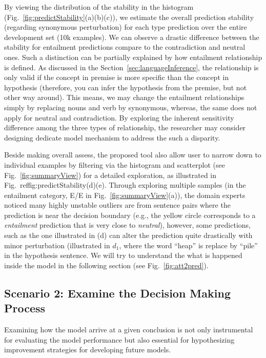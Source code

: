By viewing the distribution of the stability in the histogram (Fig.~\ref{fig:predictStability}(a)(b)(c)), we estimate the overall prediction stability (regarding synonymous perturbation) for each type prediction over the entire development set (10k examples).
%
We can observe a drastic difference between the stability for entailment predictions compare to the contradiction and neutral ones.
%
Such a distinction can be partially explained by how entailment relationship is defined. As discussed in the Section~\ref{sec:languageInference}, the relationship is only valid if the concept in premise is more specific than the concept in hypothesis (therefore, you can infer the hypothesis from the premise, but not other way around). This means, we may change the entailment relationships simply by replacing nouns and verb by synonymous, whereas, the same does not apply for neutral and contradiction.
%
By exploring the inherent sensitivity difference among the three types of relationship, the researcher may consider designing dedicate model mechanism to address the such a disparity.

Beside making overall assess, the proposed tool also allow user to narrow down to individual examples by filtering via the histogram and scatterplot (see Fig.~\ref{fig:summaryView}) for a detailed exploration, as illustrated in Fig.~ref{fig:predictStability}(d)(e). 
%
Through exploring multiple samples (in the entailment category, E/E in Fig.~\ref{fig:summaryView}(a)), the domain experts noticed many highly unstable outliers are from sentence pairs where the prediction is near the decision boundary (e.g., the yellow circle corresponds to a \emph{entailment} prediction that is very close to \emph{neutral}), however, some predictions, such as the one illustrated in (d) can alter the prediction quite drastically with minor perturbation (illustrated in $d_1$, where the word ``heap'' is replace by ``pile'' in the hypothesis sentence. We will try to understand the what is happened inside the model in the following section (see Fig.~\ref{fig:att2pred}).

\subsection{Scenario 2: Examine the Decision Making Process}

Examining how the model arrive at a given conclusion is not only instrumental for evaluating the model performance but also essential for hypothesizing improvement strategies for developing future models.

